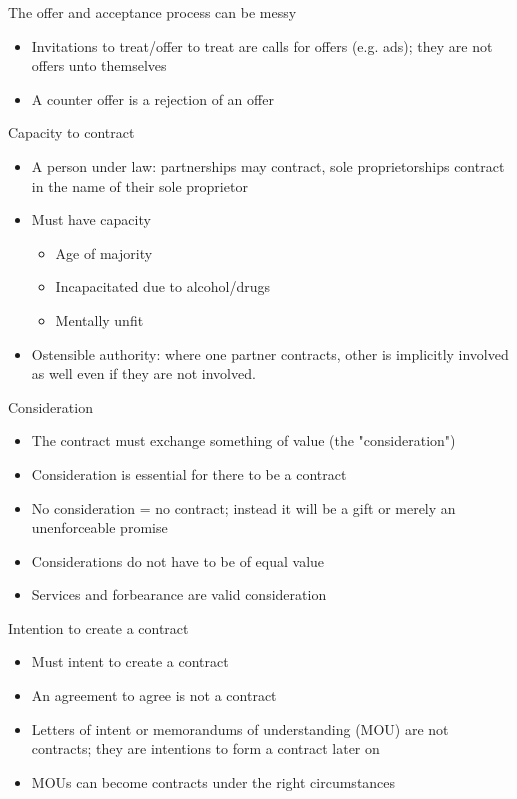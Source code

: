 \documentclass[10pt]{article}
\begin{document}
The offer and acceptance process can be messy

\begin{itemize}
	\item Invitations to treat/offer to treat are calls for offers (e.g. ads); they are not offers unto themselves
	\item A counter offer is a rejection of an offer
\end{itemize}


Capacity to contract

\begin{itemize}
	\item A person under law: partnerships may contract, sole proprietorships contract in the name of their sole proprietor
	\item Must have capacity
		\begin{itemize}
			\item Age of majority
			\item Incapacitated due to alcohol/drugs
			\item Mentally unfit
		\end{itemize}
	\item Ostensible authority: where one partner contracts, other is implicitly involved as well even if they are not involved.



\end{itemize}

Consideration
\begin{itemize}
	\item The contract must exchange something of value (the "consideration")
	\item Consideration is essential for there to be a contract
	\item No consideration = no contract; instead it will be a gift or merely an unenforceable promise
	\item Considerations do not have to be of equal value
	\item Services and forbearance are valid consideration
\end{itemize}

Intention to create a contract
\begin{itemize}
	\item Must intent to create a contract
	\item An agreement to agree is not a contract
	\item Letters of intent or memorandums of understanding (MOU) are not contracts; they are intentions to form a contract later on
	\item MOUs can become contracts under the right circumstances
\end{itemize}
\end{document}
